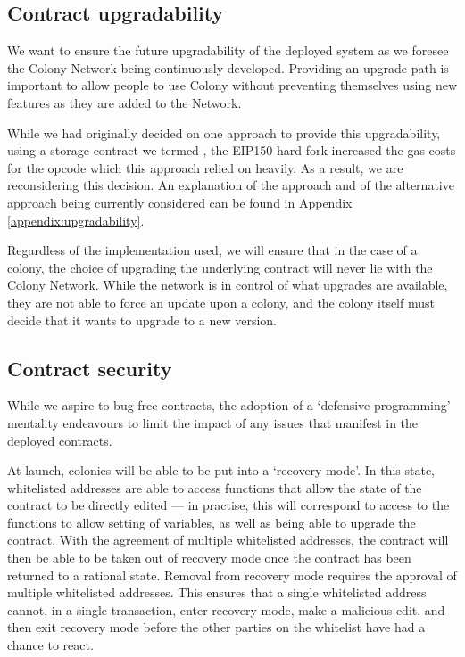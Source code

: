 \subsection{Contract upgradability}

We want to ensure the future upgradability of the deployed system as we foresee the Colony Network being continuously developed. Providing an upgrade path is important to allow people to use Colony without preventing themselves using new features as they are added to the Network.

While we had originally decided on one approach to provide this upgradability, using a storage contract we termed , the EIP150 hard fork increased the gas costs for the  opcode which this approach relied on heavily. As a result, we are reconsidering this decision. An explanation of the  approach and of the alternative approach being currently considered can be found in Appendix \ref{appendix:upgradability}.

Regardless of the implementation used, we will ensure that in the case of a colony, the choice of upgrading the underlying  contract will never lie with the Colony Network. While the network is in control of what upgrades are available, they are not able to force an update upon a colony, and the colony itself must decide that it wants to upgrade to a new version.

\subsection{Contract security}\label{sec:escape-hatches}
While we aspire to bug free contracts, the adoption of a `defensive programming' mentality endeavours to limit the impact of any issues that manifest in the deployed contracts.

At launch, colonies will be able to be put into a `recovery mode'. In this state, whitelisted addresses are able to access functions that allow the state of the contract to be directly edited --- in practise, this will correspond to access to the functions to allow setting of variables, as well as being able to upgrade the contract. With the agreement of multiple whitelisted addresses, the contract will then be able to be taken out of recovery mode once the contract has been returned to a rational state. Removal from recovery mode requires the approval of multiple whitelisted addresses. This ensures that a single whitelisted address cannot, in a single transaction, enter recovery mode, make a malicious edit, and then exit recovery mode before the other parties on the whitelist have had a chance to react.

